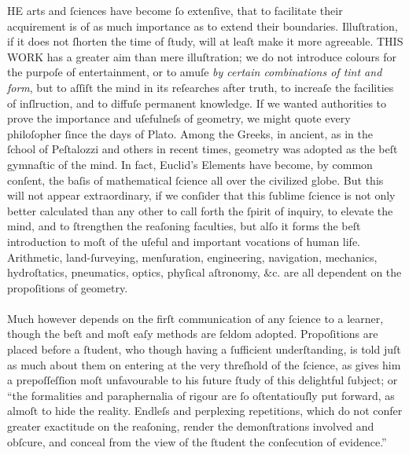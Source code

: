 \lettrine[lines=3, loversize=1, nindent=0pt]{}{}HE arts and ſciences have become ſo extenſive, that to facilitate their acquirement is of as much importance as to extend their boundaries. Illuſtration, if it does not ſhorten the time of ſtudy, will at leaſt make it more agreeable. T\textsc{HIS WORK} has a greater aim than mere illuſtration; we do not introduce colours for the purpoſe of entertainment, or to amuſe \textit{by certain combinations of tint and form}, but to aſſiſt the mind in its reſearches after truth, to increaſe the facilities of inſlruction, and to diffuſe permanent knowledge. If we wanted authorities to prove the importance and uſefulneſs of geometry, we might quote every philoſopher ſince the days of Plato. Among the Greeks, in ancient, as in the ſchool of Peſtalozzi and others in recent times, geometry was adopted as the beſt gymnaſtic of the mind. In fact, Euclid’s Elements have become, by common conſent, the baſis of mathematical ſcience all over the civilized globe. But this will not appear extraordinary, if we conſider that this ſublime ſcience is not only better calculated than any other to call forth the ſpirit of inquiry, to elevate the mind, and to ſtrengthen the reaſoning faculties, but alſo it forms the beſt introduction to moſt of the uſeful and important vocations of human life.  Arithmetic, land-ſurveying, menſuration, engineering, navigation, mechanics, hydroſtatics, pneumatics, optics, phyſical aſtronomy, \&c. are all dependent on the propoſitions of geometry.\\
\hfill\\
Much however depends on the firſt communication of any ſcience to a learner, though the beſt and moſt eaſy methods are ſeldom adopted.  Propoſitions are placed before a ſtudent, who though having a ſufficient underſtanding, is told juſt as much about them on entering at the very threſhold of the ſcience, as gives him a prepoſſeſſion moſt unfavourable to his future ſtudy of this delightful ſubject; or “the formalities and paraphernalia of rigour are ſo oſtentatiouſly put forward, as almoſt to hide the reality. Endleſs and perplexing repetitions, which do not confer greater exactitude on the reaſoning, render the demonſtrations involved and obſcure, and conceal from the view of the ſtudent the conſecution of evidence.”\\
\hfill\\
